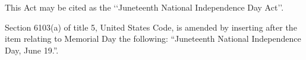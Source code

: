 \documentclass{act-usa}
\begin{document}

This Act may be cited as the ‘‘Juneteenth National Independence
Day Act’’.


Section 6103(a) of title 5, United States Code, is amended
by inserting after the item relating to Memorial Day the following:
``Juneteenth National Independence Day, June 19.''.	


	
\end{document}
